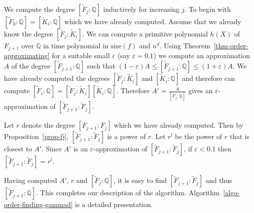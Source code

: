 \documentclass[11pt]{madras}%
\theoremstyle{remark}
\newcommand{\size}[1]{{\ensuremath{\mathrm{size}\left(#1\right)}}}
\begin{document}
We compute the degree $[\tilde{F}_j : \mathbb{Q}]$ inductively for
increasing $j$. To begin with $[\tilde{F}_0 :\mathbb{Q}] =
[\tilde{K}_i:\mathbb{Q}]$ which we have already computed. Assume that
we already know the degree $[\tilde{F}_j :\tilde{K}_i]$. We can
compute a primitive polynomial $h(X)$ of $F_{j+1}$ over $\mathbb{Q}$
in time polynomial in $\size{f}$ and $n^d$. Using
Theorem~\ref{thm-order-approximating} for a suitable small
$\varepsilon$ (say $\varepsilon = 0.1$) we compute an approximation
$A$ of the degree $[\tilde{F}_{j+1}: \mathbb{Q}]$ such that $(1 -
\varepsilon) A \leq [\tilde{F}_{j+1} : \mathbb{Q}] \leq (1 +
\varepsilon) A$. We have already computed the degrees
$[\tilde{F}_j:\tilde{K}_i]$ and $[\tilde{K}_i:\mathbb{Q}]$ and
therefore can compute $[\tilde{F}_i : \mathbb{Q}] =
[\tilde{F}_j:\tilde{K}_i][\tilde{K}_i:\mathbb{Q}]$. Therefore $A' =
\frac{A}{[\tilde{F}_j:\mathbb{Q}]}$ gives an
$\varepsilon$-approximation of $[\tilde{F}_{j+1}:\tilde{F}_j]$.


Let $r$ denote the degree $[F_{j+1}:F_j]$ which we have already
computed.  Then by Proposition~\ref{prop-fj},
$[\tilde{F}_{j+1}:\tilde{F}_j]$ is a power of $r$. Let $r^l$ be the
power of $r$ that is closest to $A'$. Since $A'$ is an
$\varepsilon$-approximation of $[\tilde{F}_{j+1}:\tilde{F}_j]$, if
$\varepsilon < 0.1$ then $[\tilde{F}_{j+1}:\tilde{F}_j] = r^l$.

Having computed $A'$, $r$ and $[\tilde{F}_j:\mathbb{Q}]$, it is easy
to find $[\tilde{F}_{j+1}:\tilde{F}_j]$ and thus
$[\tilde{F}_{j+1}:\mathbb{Q}]$. This completes our description of the
algorithm. Algorithm~\ref{algo-order-finding-gammad} is a detailed
presentation.
\end{document}
